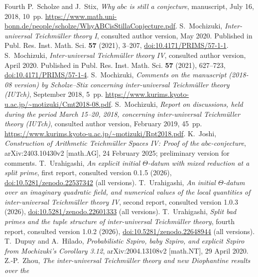 \documentclass[11pt]{article}
\theoremstyle{remark}
\begin{document}
\begin{thebibliography}{Fourth}
 P.~Scholze and J.~Stix,
\emph{Why $abc$ is still a conjecture}, manuscript, July 16, 2018, 10~pp.
\url{https://www.math.uni-bonn.de/people/scholze/WhyABCisStillaConjecture.pdf}.
 S.~Mochizuki,
\emph{Inter-universal Teichm\"uller theory I}, consulted author version,
May 2020. Published in Publ. Res. Inst. Math. Sci. \textbf{57} (2021), 3--207,
\href{https://doi.org/10.4171/PRIMS/57-1-1}{doi:10.4171/PRIMS/57-1-1}.
 S.~Mochizuki,
\emph{Inter-universal Teichm\"uller theory IV}, consulted author version,
April 2020. Published in Publ. Res. Inst. Math. Sci. \textbf{57} (2021), 627--723,
\href{https://doi.org/10.4171/PRIMS/57-1-4}{doi:10.4171/PRIMS/57-1-4}.
 S.~Mochizuki,
\emph{Comments on the manuscript (2018-08 version) by Scholze--Stix concerning
inter-universal Teichm\"uller theory (IUTch)}, September 2018, 5~pp.
\url{https://www.kurims.kyoto-u.ac.jp/~motizuki/Cmt2018-08.pdf}.
 S.~Mochizuki,
\emph{Report on discussions, held during the period March 15--20, 2018,
concerning inter-universal Teichm\"uller theory (IUTch)},
consulted author version, February 2019, 45~pp.
\url{https://www.kurims.kyoto-u.ac.jp/~motizuki/Rpt2018.pdf}.
 K.~Joshi,
\emph{Construction of Arithmetic Teichm\"uller Spaces IV: Proof of the
$abc$-conjecture}, arXiv:2403.10430v2 [math.AG], 24 February 2025;
preliminary version for comments.
 T.~Urahigashi,
\emph{An explicit initial $\Theta$-datum with mixed reduction at a split prime},
first report, consulted version 0.1.5 (2026),
\href{https://doi.org/10.5281/zenodo.22537342}{doi:10.5281/zenodo.22537342} (all versions).
 T.~Urahigashi,
\emph{An initial $\Theta$-datum over an imaginary quadratic field, and numerical
values of the local quantities of inter-universal Teichm\"uller theory IV},
second report, consulted version 1.0.3 (2026),
\href{https://doi.org/10.5281/zenodo.22601333}{doi:10.5281/zenodo.22601333} (all versions).
 T.~Urahigashi,
\emph{Split bad primes and the tuple structure of inter-universal
Teichm\"uller theory}, fourth report, consulted version 1.0.2 (2026),
\href{https://doi.org/10.5281/zenodo.22648944}{doi:10.5281/zenodo.22648944} (all versions).
 T.~Dupuy and A.~Hilado,
\emph{Probabilistic Szpiro, baby Szpiro, and explicit Szpiro from Mochizuki's
Corollary 3.12}, arXiv:2004.13108v2 [math.NT], 29 April 2020.
 Z.-P.~Zhou,
\emph{The inter-universal Teichm\"uller theory and new Diophantine results over the
}
\end{thebibliography}
\end{document}
